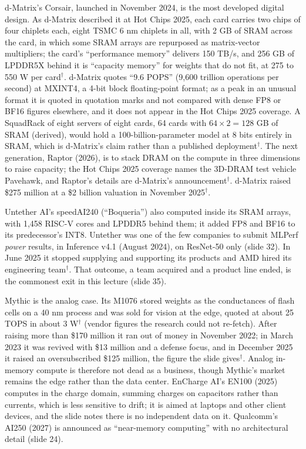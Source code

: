 \documentclass[11pt,letterpaper]{article}
\begin{document}
d-Matrix's Corsair, launched in November 2024, is the most developed digital design. As d-Matrix described it at Hot Chips 2025, each card carries two chips of four chiplets each, eight TSMC 6 nm chiplets in all, with 2 GB of SRAM across the card, in which some SRAM arrays are repurposed as matrix-vector multipliers; the card's ``performance memory'' delivers 150 TB/s, and 256 GB of LPDDR5X behind it is ``capacity memory'' for weights that do not fit, at 275 to 550 W per card$^\dagger$. d-Matrix quotes ``9.6 POPS'' (9{,}600 trillion operations per second) at MXINT4, a 4-bit block floating-point format; as a peak in an unusual format it is quoted in quotation marks and not compared with dense FP8 or BF16 figures elsewhere, and it does not appear in the Hot Chips 2025 coverage. A SquadRack of eight servers of eight cards, 64 cards with $64\times2 = 128$ GB of SRAM (derived), would hold a 100-billion-parameter model at 8 bits entirely in SRAM, which is d-Matrix's claim rather than a published deployment$^\dagger$. The next generation, Raptor (2026), is to stack DRAM on the compute in three dimensions to raise capacity; the Hot Chips 2025 coverage names the 3D-DRAM test vehicle Pavehawk, and Raptor's details are d-Matrix's announcement$^\dagger$. d-Matrix raised \$275 million at a \$2 billion valuation in November 2025$^\dagger$.

Untether AI's speedAI240 (``Boqueria'') also computed inside its SRAM arrays, with 1{,}458 RISC-V cores and LPDDR5 behind them; it added FP8 and BF16 to its predecessor's INT8. Untether was one of the few companies to submit MLPerf \emph{power} results, in Inference v4.1 (August 2024), on ResNet-50 only (slide 32). In June 2025 it stopped supplying and supporting its products and AMD hired its engineering team$^\dagger$. That outcome, a team acquired and a product line ended, is the commonest exit in this lecture (slide 35).

Mythic is the analog case. Its M1076 stored weights as the conductances of flash cells on a 40 nm process and was sold for vision at the edge, quoted at about 25 TOPS in about 3 W$^\dagger$ (vendor figures the research could not re-fetch). After raising more than \$170 million it ran out of money in November 2022; in March 2023 it was revived with \$13 million and a defense focus, and in December 2025 it raised an oversubscribed \$125 million, the figure the slide gives$^\dagger$. Analog in-memory compute is therefore not dead as a business, though Mythic's market remains the edge rather than the data center. EnCharge AI's EN100 (2025) computes in the charge domain, summing charges on capacitors rather than currents, which is less sensitive to drift; it is aimed at laptops and other client devices, and the slide notes there is no independent data on it. Qualcomm's AI250 (2027) is announced as ``near-memory computing'' with no architectural detail (slide 24).
\end{document}
